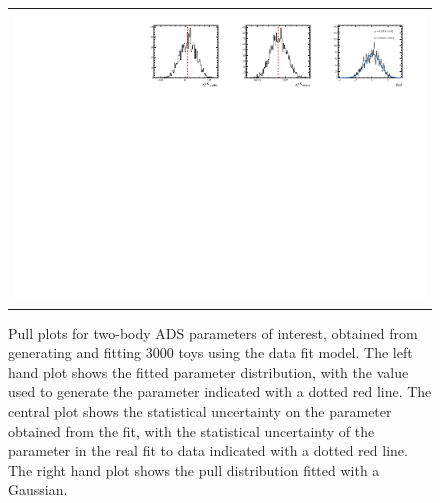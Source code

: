 \begin{figure}
\begin{tabular}{c}
\includegraphics[width=\textwidth]{ANA_resources/Plots/Data_fit/FitterBias//split//A_Bs_piK.pdf} \\
  \end{tabular}
  \caption{Pull plots for two-body ADS parameters of interest, obtained from generating and fitting 3000 toys using the data fit model. The left hand plot shows the fitted parameter distribution, with the value used to generate the parameter indicated with a dotted red line. The central plot shows the statistical uncertainty on the parameter obtained from the fit, with the statistical uncertainty of the parameter in the real fit to data indicated with a dotted red line. The right hand plot shows the pull distribution fitted with a Gaussian.}
\label{fig:twoBody_ADS/split/_pulls}
\end{figure}
